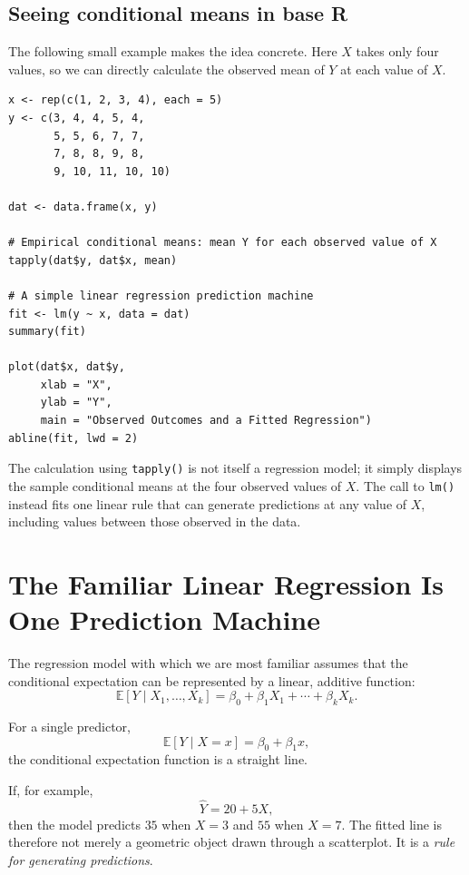 \documentclass[11pt]{report}
\newcommand{\E}{\mathbb{E}}
\begin{document}
\subsection{Seeing conditional means in base R}

The following small example makes the idea concrete. Here \(X\) takes only four values, so we can directly calculate the observed mean of \(Y\) at each value of \(X\).

\begin{lstlisting}
x <- rep(c(1, 2, 3, 4), each = 5)
y <- c(3, 4, 4, 5, 4,
       5, 5, 6, 7, 7,
       7, 8, 8, 9, 8,
       9, 10, 11, 10, 10)

dat <- data.frame(x, y)

# Empirical conditional means: mean Y for each observed value of X
tapply(dat$y, dat$x, mean)

# A simple linear regression prediction machine
fit <- lm(y ~ x, data = dat)
summary(fit)

plot(dat$x, dat$y,
     xlab = "X",
     ylab = "Y",
     main = "Observed Outcomes and a Fitted Regression")
abline(fit, lwd = 2)
\end{lstlisting}

The calculation using \texttt{tapply()} is not itself a regression model; it simply displays the sample conditional means at the four observed values of \(X\). The call to \texttt{lm()} instead fits one linear rule that can generate predictions at any value of \(X\), including values between those observed in the data.

\section{The Familiar Linear Regression Is One Prediction Machine}

The regression model with which we are most familiar assumes that the conditional expectation can be represented by a linear, additive function:
\[
\E[Y\mid X_1,\ldots,X_k]
=
\beta_0+\beta_1X_1+\cdots+\beta_kX_k.
\]

For a single predictor,
\[
\E[Y\mid X=x]=\beta_0+\beta_1x,
\]
the conditional expectation function is a straight line.

If, for example,
\[
\widehat{Y}=20+5X,
\]
then the model predicts \(35\) when \(X=3\) and \(55\) when \(X=7\). The fitted line is therefore not merely a geometric object drawn through a scatterplot. It is a \emph{rule for generating predictions}.
\end{document}
